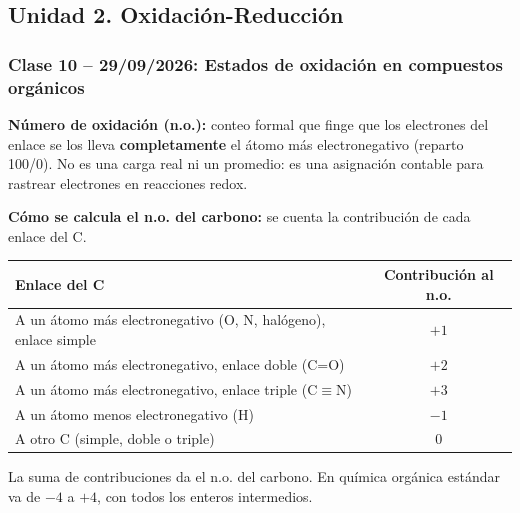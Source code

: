 {}
\subsection*{\textcolor{blueunam}{Unidad 2. Oxidación-Reducción}}

{}
\subsubsection*{\textcolor{blueunam}{Clase 10 -- 29/09/2026: Estados de oxidación en compuestos orgánicos}}

\textbf{Número de oxidación (n.o.):} conteo formal que finge que los electrones 
del enlace se los lleva \textbf{completamente} el átomo más electronegativo 
(reparto 100/0). No es una carga real ni un promedio: es una asignación contable 
para rastrear electrones en reacciones redox.

\textbf{Cómo se calcula el n.o. del carbono:} se cuenta la contribución de cada 
enlace del C.

\begin{center}
\begin{tabular}{|l|c|}
\hline
\textbf{Enlace del C} & \textbf{Contribución al n.o.} \\
\hline
A un átomo más electronegativo (O, N, halógeno), enlace simple & $+1$ \\
A un átomo más electronegativo, enlace doble (C=O) & $+2$ \\
A un átomo más electronegativo, enlace triple (C$\equiv$N) & $+3$ \\
A un átomo menos electronegativo (H) & $-1$ \\
A otro C (simple, doble o triple) & $0$ \\
\hline
\end{tabular}
\end{center}

La suma de contribuciones da el n.o. del carbono. En química orgánica estándar 
va de $-4$ a $+4$, con todos los enteros intermedios.

